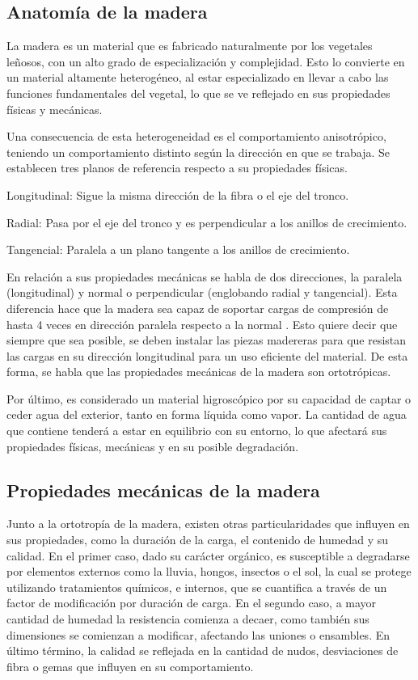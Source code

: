 \subsection{Anatomía de la madera}
La madera es un material que es fabricado naturalmente por los vegetales leñosos, con un alto grado de especialización y complejidad. Esto lo convierte en un material altamente heterogéneo, al estar especializado en llevar a cabo las funciones fundamentales del vegetal, lo que se ve reflejado en sus propiedades físicas y mecánicas. 

Una consecuencia de esta heterogeneidad es el comportamiento anisotrópico, teniendo un comportamiento distinto según la dirección en que se trabaja. Se establecen tres planos de referencia respecto a su propiedades físicas.
\begin{itemize*}
	\item Longitudinal: Sigue la misma dirección de la fibra o el eje del tronco.
	\item Radial: Pasa por el eje del tronco y es perpendicular a los anillos de crecimiento.
	\item Tangencial: Paralela a un plano tangente a los anillos de crecimiento.
\end{itemize*}
En relación a sus propiedades mecánicas se habla de dos direcciones, la paralela (longitudinal) y normal o perpendicular (englobando radial y tangencial). Esta diferencia hace que la madera sea capaz de soportar cargas de compresión de hasta 4 veces en dirección paralela respecto a la normal \cite{obe2002timber}. Esto quiere decir que siempre que sea posible, se deben instalar las piezas madereras para que resistan las cargas en su dirección longitudinal para un uso eficiente del material. De esta forma, se habla que las propiedades mecánicas de la madera son ortotrópicas.

Por último, es considerado un material higroscópico por su capacidad de captar o ceder agua del exterior, tanto en forma líquida como vapor. La cantidad de agua que contiene tenderá a estar en equilibrio con su entorno, lo que afectará sus propiedades físicas, mecánicas y en su posible degradación.

\subsection{Propiedades mecánicas de la madera}
Junto a la ortotropía de la madera, existen otras particularidades que influyen en sus propiedades, como la duración de la carga, el contenido de humedad y su calidad. En el primer caso, dado su carácter orgánico, es susceptible a degradarse por elementos externos como la lluvia, hongos, insectos o el sol, la cual se protege utilizando tratamientos químicos, e internos, que se cuantifica a través de un factor de modificación por duración de carga. En el segundo caso, a mayor cantidad de humedad la resistencia comienza a decaer, como también sus dimensiones se comienzan a modificar, afectando las uniones o ensambles. En último término, la calidad se reflejada en la cantidad de nudos, desviaciones de fibra o gemas que influyen en su comportamiento.

